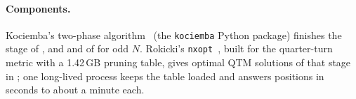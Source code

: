 \paragraph{Components.}
Kociemba's two-phase algorithm~\cite{kociemba2phase} (the \texttt{kociemba} Python package) finishes the  stage of
\Mtwo, \Mthree and \FiveC and of \Btwo for odd $N$. Rokicki's \texttt{nxopt}~\cite{rokicki2018nxopt}, built for the
quarter-turn metric with a 1.42\,GB pruning table, gives optimal QTM solutions of that stage in \Mseven; one
long-lived process keeps the table loaded and answers positions in seconds to about a minute each.
